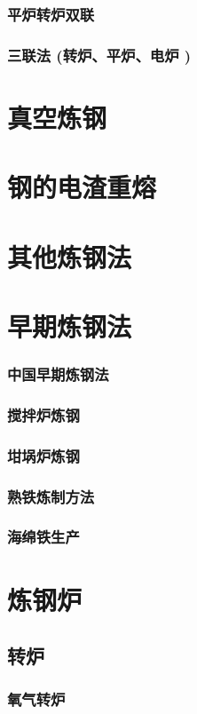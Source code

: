 \documentclass[UTF8]{../../ApplicationUniverse}
\begin{document}
    \subsubsection{平炉转炉双联}
    \subsubsection{三联法 (转炉、平炉、电炉 )}
\section{真空炼钢}
\section{钢的电渣重熔}
\section{其他炼钢法}
\section{早期炼钢法}
    \subsubsection{中国早期炼钢法}
    \subsubsection{搅拌炉炼钢}
    \subsubsection{坩埚炉炼钢}
    \subsubsection{熟铁炼制方法}
    \subsubsection{海绵铁生产}
\section{炼钢炉}
    \subsection{转炉}
        \subsubsection{氧气转炉}
\end{document}
